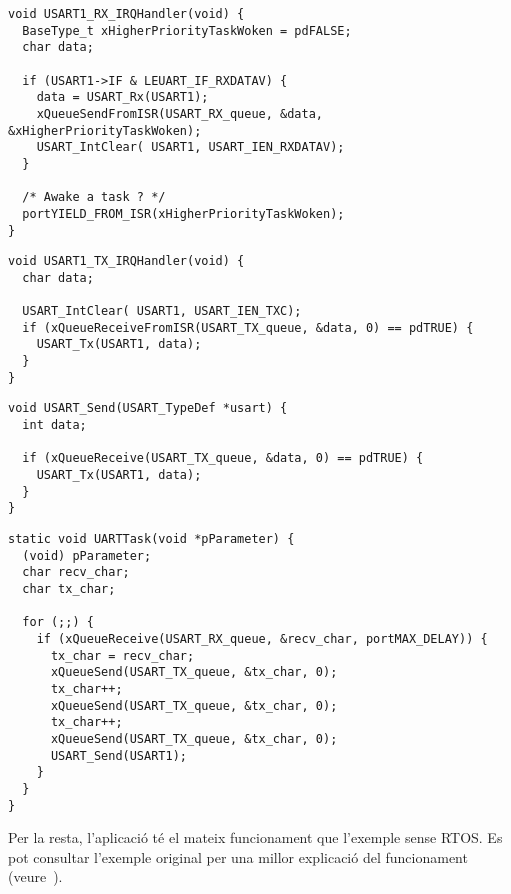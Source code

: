  \begin{lstlisting}[style=customc,caption={ISR de RX de la UART amb FreeRTOS}]
void USART1_RX_IRQHandler(void) {
  BaseType_t xHigherPriorityTaskWoken = pdFALSE;
  char data;

  if (USART1->IF & LEUART_IF_RXDATAV) {
    data = USART_Rx(USART1);
    xQueueSendFromISR(USART_RX_queue, &data, &xHigherPriorityTaskWoken);
    USART_IntClear( USART1, USART_IEN_RXDATAV);
  }

  /* Awake a task ? */
  portYIELD_FROM_ISR(xHigherPriorityTaskWoken);
}
\end{lstlisting}

\begin{lstlisting}[style=customc,caption={ISR de TX de la UART amb FreeRTOS}]
void USART1_TX_IRQHandler(void) {
  char data;

  USART_IntClear( USART1, USART_IEN_TXC);
  if (xQueueReceiveFromISR(USART_TX_queue, &data, 0) == pdTRUE) {
    USART_Tx(USART1, data);
  }
}
\end{lstlisting}

\begin{lstlisting}[style=customc,caption={funció UART\_Send() per FreeRTOS}]
void USART_Send(USART_TypeDef *usart) {
  int data;

  if (xQueueReceive(USART_TX_queue, &data, 0) == pdTRUE) {
    USART_Tx(USART1, data);
  }
}
\end{lstlisting}

\begin{lstlisting}[style=customc,caption=Tasca principal de l'exemple]
static void UARTTask(void *pParameter) {
  (void) pParameter;
  char recv_char;
  char tx_char;

  for (;;) {
    if (xQueueReceive(USART_RX_queue, &recv_char, portMAX_DELAY)) {
      tx_char = recv_char;
      xQueueSend(USART_TX_queue, &tx_char, 0);
      tx_char++;
      xQueueSend(USART_TX_queue, &tx_char, 0);
      tx_char++;
      xQueueSend(USART_TX_queue, &tx_char, 0);
      USART_Send(USART1);
    }
  }
}
\end{lstlisting}


Per la resta, l'aplicació té el mateix funcionament que l'exemple sense RTOS. Es pot consultar l'exemple original per una millor explicació del funcionament (veure~).


